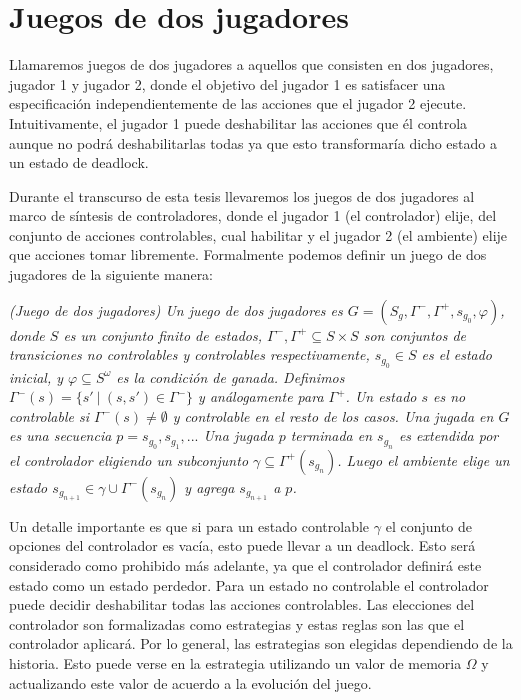\section{Juegos de dos jugadores}

Llamaremos juegos de dos jugadores a aquellos que consisten en dos jugadores, jugador 1 y jugador 2, donde el objetivo
del jugador 1 es satisfacer una especificación independientemente de las acciones que el jugador 2 ejecute.
Intuitivamente, el jugador 1 puede deshabilitar las acciones que él controla aunque no podrá deshabilitarlas todas ya
que esto transformaría dicho estado a un estado de deadlock.

Durante el transcurso de esta tesis llevaremos los juegos de dos jugadores al marco de síntesis de controladores, donde
el jugador 1 (el controlador) elije, del conjunto de acciones controlables, cual habilitar y el jugador 2 (el ambiente)
elije que acciones tomar libremente. Formalmente podemos definir un juego de dos jugadores de la siguiente manera:

\begin{nahaDef}
    \emph{(Juego de dos jugadores) Un juego de dos jugadores es $G = (S_g, \Gamma^-, \Gamma^+, s_{g_0}, \varphi)$, donde
    $S$ es un conjunto finito de estados, $\Gamma^-, \Gamma^+ \subseteq S \times S$ son conjuntos de transiciones no
    controlables y controlables respectivamente, $s_{g_0} \in S$ es el estado inicial, y $\varphi \subseteq S^\omega$ es
    la condición de ganada. Definimos $\Gamma^-(s) = \{s'\ |\ (s,s') \in \Gamma^-\}$ y análogamente para $\Gamma^+$. Un
    estado $s$ es no controlable si $\Gamma^-(s) \neq \emptyset$ y controlable en el resto de los casos. Una jugada en
    $G$ es una secuencia $p = s_{g_0}, s_{g_1},...$ Una jugada $p$ terminada en $s_{g_n}$ es extendida por el
    controlador eligiendo un subconjunto $\gamma \subseteq \Gamma^+(s_{g_n})$. Luego el ambiente elige un estado
    $s_{g_{n+1}} \in \gamma \cup \Gamma^-(s_{g_n})$ y agrega $s_{g_{n+1}}$ a $p$.}
\end{nahaDef}

Un detalle importante es que si para un estado controlable $\gamma$ el conjunto de opciones del controlador es vacía, esto
puede llevar a un deadlock. Esto será considerado como prohibido más adelante, ya que el controlador definirá este estado
como un estado perdedor. Para un estado no controlable el controlador puede decidir deshabilitar todas las acciones
controlables. Las elecciones del controlador son formalizadas como estrategias y estas reglas son las que el controlador
aplicará. Por lo general, las estrategias son elegidas dependiendo de la historia. Esto puede verse en la estrategia
utilizando un valor de memoria $\Omega$ y actualizando este valor de acuerdo a la evolución del juego.

